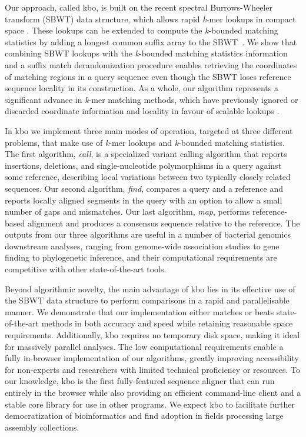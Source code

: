 \documentclass[unnumsec,webpdf,contemporary,large]{oup-authoring-template}%
\theoremstyle{thmstyleone}%
\theoremstyle{thmstyletwo}%
\theoremstyle{thmstylethree}%
\begin{document}
Our approach, called {\sf kbo}, is built on the recent spectral Burrows-Wheeler transform (SBWT) data structure, which allows rapid \emph{k}-mer lookups in compact space \cite{alanko2023small}. These lookups can be extended to compute the \emph{k}-bounded matching statistics by adding a longest common suffix array to the SBWT~\cite{alanko2023longest,alanko2024finimizers}. We show that combining SBWT lookups with the \emph{k}-bounded matching statistics information and a suffix match derandomization procedure enables retrieving the coordinates of matching regions in a query sequence even though the SBWT loses reference sequence locality in its construction. As a whole, our algorithm represents a significant advance in \emph{k}-mer matching methods, which have previously ignored or discarded coordinate information and locality in favour of scalable lookups \cite{alanko2023themisto,fan2024fulgor}.

In {\sf kbo} we implement three main modes of operation, targeted at three different problems, that make use of \emph{k}-mer lookups and \emph{k}-bounded matching statistics. The first algorithm, \textit{call}, is a specialized variant calling algorithm that reports insertions, deletions, and single-nucleotide polymorphisms in a query against some reference, describing local variations between two typically closely related sequences. Our second algorithm, \textit{find}, compares a query and a reference and reports locally aligned segments in the query with an option to allow a small number of gaps and mismatches. Our last algorithm, \textit{map}, performs reference-based alignment and produces a consensus sequence relative to the reference. The outputs from our three algorithms are useful in a number of bacterial genomics downstream analyses, ranging from genome-wide association studies to gene finding to phylogenetic inference, and their computational requirements are competitive with other state-of-the-art tools.

Beyond algorithmic novelty, the main advantage of {\sf kbo} lies in its effective use of the SBWT data structure to perform comparisons in a rapid and parallelisable manner. We demonstrate that our implementation either matches or beats state-of-the-art methods in both accuracy and speed while retaining reasonable space requirements. Additionally, {\sf kbo} requires no temporary disk space, making it ideal for massively parallel analyses. The low computational requirements enable a fully in-browser implementation of our algorithms, greatly improving accessibility for non-experts and researchers with limited technical proficiency or resources. To our knowledge, {\sf kbo} is the first fully-featured sequence aligner that can run entirely in the browser while also providing an efficient command-line client and a stable core library for use in other programs. We expect {\sf kbo} to facilitate further democratization of bioinformatics and find adoption in fields processing large assembly collections.
\end{document}
